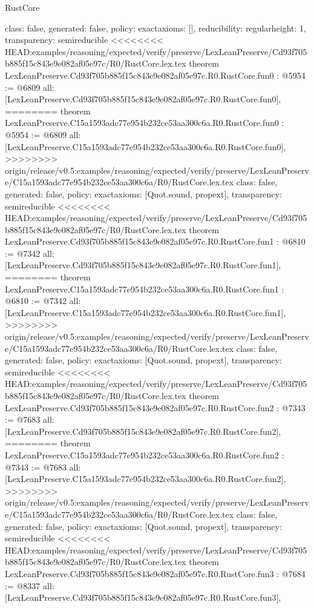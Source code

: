 \begin{lexlean}{RustCore}
\begin{coremodule}
{\begin{coremodule}
{{{  class: false,
  generated: false,
  policy: exact{axioms: []},
  reducibility: regular{height: 1},
  transparency: semireducible
}
<<<<<<<< HEAD:examples/reasoning/expected/verify/preserve/LexLeanPreserve/Cd93f705b885f15c843e9e082af05e97c/R0/RustCore.lex.tex
theorem LexLeanPreserve.Cd93f705b885f15c843e9e082af05e97c.R0.RustCore.fun0 : @5954 := @6809 {
  all: [LexLeanPreserve.Cd93f705b885f15c843e9e082af05e97c.R0.RustCore.fun0],
========
theorem LexLeanPreserve.C15a1593adc77e954b232ce53aa300c6a.R0.RustCore.fun0 : @5954 := @6809 {
  all: [LexLeanPreserve.C15a1593adc77e954b232ce53aa300c6a.R0.RustCore.fun0],
>>>>>>>> origin/release/v0.5:examples/reasoning/expected/verify/preserve/LexLeanPreserve/C15a1593adc77e954b232ce53aa300c6a/R0/RustCore.lex.tex
  class: false,
  generated: false,
  policy: exact{axioms: [Quot.sound, propext]},
  transparency: semireducible
}
<<<<<<<< HEAD:examples/reasoning/expected/verify/preserve/LexLeanPreserve/Cd93f705b885f15c843e9e082af05e97c/R0/RustCore.lex.tex
theorem LexLeanPreserve.Cd93f705b885f15c843e9e082af05e97c.R0.RustCore.fun1 : @6810 := @7342 {
  all: [LexLeanPreserve.Cd93f705b885f15c843e9e082af05e97c.R0.RustCore.fun1],
========
theorem LexLeanPreserve.C15a1593adc77e954b232ce53aa300c6a.R0.RustCore.fun1 : @6810 := @7342 {
  all: [LexLeanPreserve.C15a1593adc77e954b232ce53aa300c6a.R0.RustCore.fun1],
>>>>>>>> origin/release/v0.5:examples/reasoning/expected/verify/preserve/LexLeanPreserve/C15a1593adc77e954b232ce53aa300c6a/R0/RustCore.lex.tex
  class: false,
  generated: false,
  policy: exact{axioms: [Quot.sound, propext]},
  transparency: semireducible
}
<<<<<<<< HEAD:examples/reasoning/expected/verify/preserve/LexLeanPreserve/Cd93f705b885f15c843e9e082af05e97c/R0/RustCore.lex.tex
theorem LexLeanPreserve.Cd93f705b885f15c843e9e082af05e97c.R0.RustCore.fun2 : @7343 := @7683 {
  all: [LexLeanPreserve.Cd93f705b885f15c843e9e082af05e97c.R0.RustCore.fun2],
========
theorem LexLeanPreserve.C15a1593adc77e954b232ce53aa300c6a.R0.RustCore.fun2 : @7343 := @7683 {
  all: [LexLeanPreserve.C15a1593adc77e954b232ce53aa300c6a.R0.RustCore.fun2],
>>>>>>>> origin/release/v0.5:examples/reasoning/expected/verify/preserve/LexLeanPreserve/C15a1593adc77e954b232ce53aa300c6a/R0/RustCore.lex.tex
  class: false,
  generated: false,
  policy: exact{axioms: [Quot.sound, propext]},
  transparency: semireducible
}
<<<<<<<< HEAD:examples/reasoning/expected/verify/preserve/LexLeanPreserve/Cd93f705b885f15c843e9e082af05e97c/R0/RustCore.lex.tex
theorem LexLeanPreserve.Cd93f705b885f15c843e9e082af05e97c.R0.RustCore.fun3 : @7684 := @8337 {
  all: [LexLeanPreserve.Cd93f705b885f15c843e9e082af05e97c.R0.RustCore.fun3],
}}}}}}
\end{coremodule}}
\end{coremodule}
\end{lexlean}
